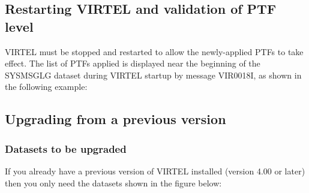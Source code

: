 \documentclass[letterpaper,10pt,english]{sphinxmanual}
\begin{document}


\subsection{Restarting VIRTEL and validation of PTF level}
\label{\detokenize{Installation_Guide:restarting-virtel-and-validation-of-ptf-level}}
VIRTEL must be stopped and restarted to allow the newly-applied PTFs to take effect. The list of PTFs applied is displayed near the beginning of the SYSMSGLG dataset during VIRTEL startup by message VIR0018I, as shown in the following example:

\begin{sphinxVerbatim}[commandchars=\\\{\}]
     

     
\end{sphinxVerbatim}


\subsection{Upgrading from a previous version}
\label{\detokenize{Installation_Guide:upgrading-from-a-previous-version}}

\subsubsection{Datasets to be upgraded}
\label{\detokenize{Installation_Guide:datasets-to-be-upgraded}}
If you already have a previous version of VIRTEL installed (version 4.00 or later) then you only need the datasets shown in the figure below:

\begin{sphinxVerbatim}[commandchars=\\\{\}]
\end{sphinxVerbatim}
\end{document}
